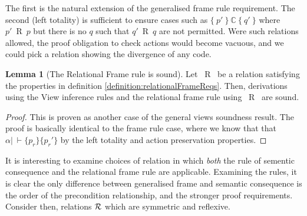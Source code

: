 \documentclass{article}
\theoremstyle{definition}
\theoremstyle{theorem}
\newtheorem{lemma}{Lemma}
\newcommand{\Code}{\mathbb{C}}
\newcommand{\action}{\alpha}
\newcommand{\curly}[1]{{ \cal #1 }}
\newcommand{\frameRel}{~\mathop{R}~}
\newcommand{\triple}[3]{\{\ #1\ \}\ #2\ \{\ #3\ \}}
\begin{document}
The first is the natural extension of the generalised frame rule requirement. The second (left totality) is sufficient to ensure cases such as $\triple{p'}{\Code}{q'}$ where $p' \frameRel p$ but there is no $q$ such that $q' \frameRel q$ are not permitted. Were such relations allowed, the proof obligation to check actions would become vacuous, and we could pick a relation showing the divergence of any code.

\begin{lemma}[The Relational Frame rule is sound]
  Let $\frameRel$ be a relation satisfying the properties in definition \ref{definition:relationalFrameReqs}. Then, derivations using the View inference rules and the relational frame rule using $\frameRel$ are sound.

  \begin{proof}
    This is proven as another case of the general views soundness result. The proof is basically identical to the frame rule case, where we know that that $\action |~\vdash \{ p_r \}\{p_r'\}$ by the left totality and action preservation properties.
  \end{proof}
\end{lemma}

It is interesting to examine choices of relation in which \emph{both} the rule of sementic consequence and the relational frame rule are applicable. Examining the rules, it is clear the only difference between generalised frame and semantic consequence is the order of the precondition relationship, and the stronger proof requirements. Consider then, relations $\curly{R}$ which are symmetric and reflexive. 
\end{document}
